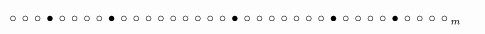 \documentclass[aspectratio=169,xcolor=dvipsnames]{beamer}
\begin{document}
\begin{frame}
\begin{itemize}
{\[{        \stackrel{{\color{white} n_{9}}}{\circ}
        \stackrel{{\color{white} n_{9}}}{\circ}
        \stackrel{{\color{white} n_{9}}}{\circ}
        \stackrel{{\color{white} n_{9}}}{\bullet}
        \stackrel{{\color{white} n_{9}}}{\circ}
        \stackrel{{\color{white} n_{9}}}{\circ}
        \stackrel{{\color{white} n_{9}}}{\circ}
        \stackrel{{\color{white} n_{9}}}{\circ}
        \stackrel{{\color{white} n_{9}}}{\bullet}
        \stackrel{{\color{white} n_{9}}}{\circ}
        \stackrel{{\color{white} n_{9}}}{\circ}
        \stackrel{{\color{white} n_{9}}}{\circ}
        \stackrel{{\color{white} n_{9}}}{\circ}
        \stackrel{{\color{white} n_{9}}}{\circ}
        \stackrel{{\color{white} n_{9}}}{\circ}
        \stackrel{{\color{white} n_{9}}}{\circ}
        \stackrel{{\color{white} n_{9}}}{\circ}
        \stackrel{{\color{white} n_{9}}}{\circ}
        \stackrel{{\color{white} n_{9}}}{\bullet}
        \stackrel{{\color{white} n_{9}}}{\circ}
        \stackrel{{\color{white} n_{9}}}{\circ}
        \stackrel{{\color{white} n_{9}}}{\circ}
        \stackrel{{\color{white} n_{9}}}{\circ}
        \stackrel{{\color{white} n_{9}}}{\circ}
        \stackrel{{\color{white} n_{9}}}{\circ}
        \stackrel{{\color{white} n_{9}}}{\circ}
        \stackrel{{\color{white} n_{9}}}{\bullet}
        \stackrel{{\color{white} n_{9}}}{\circ}
        \stackrel{{\color{white} n_{9}}}{\circ}
        \stackrel{{\color{white} n_{9}}}{\circ}
        \stackrel{{\color{white} n_{9}}}{\circ}
        \stackrel{{\color{white} n_{9}}}{\bullet}
        \stackrel{{\color{white} n_{9}}}{\circ}
        \stackrel{{\color{white} n_{9}}}{\circ}
        \stackrel{{\color{white} n_{9}}}{\circ}
        \stackrel{{\color{white} n_{9}}}{\circ}
      }_{m_{\color{white}{9}}{\color{white}/2}}
     \]
    }%
\end{itemize}
\end{frame}
\end{document}
